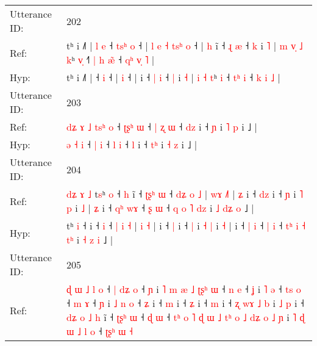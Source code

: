 \documentclass[10pt]{article}
\DeclareRobustCommand{\hl}[1]{{\textcolor{red}{#1}}}
\begin{document}
\begin{longtable}{ll}
Utterance ID: & 202 \\
Ref: & tʰ i ˩˥ |\hl{ }\hl{l}\hl{ }\hl{e} ˧\hl{ }\hl{t}\hl{s}\hl{ʰ} \hl{o} ˧ |\hl{ }\hl{l}\hl{ }\hl{e}\hl{ }\hl{˧}\hl{ }\hl{t}\hl{s}\hl{ʰ} \hl{o} ˧ |\hl{ }\hl{h} i\hl{̃} ˧ \hl{ɻ} \hl{æ} ˧ \hl{k} i \hl{˥} |\hl{ }\hl{m} \hl{v}\hl{̩} \hl{˩} \hl{k}ʰ \hl{v}\hl{̩} ˧\hl{˥} \hl{|}\hl{ }\hl{h} \hl{æ}\hl{̃} ˧ \hl{q}\hl{ʰ} \hl{v}\hl{̩} \hl{˥} |
 \\
Hyp: & tʰ i ˩˥ |\hl{}\hl{}\hl{}\hl{} ˧\hl{}\hl{}\hl{}\hl{} \hl{i} ˧ |\hl{}\hl{}\hl{}\hl{}\hl{}\hl{}\hl{}\hl{}\hl{}\hl{} \hl{i} ˧ |\hl{}\hl{} i\hl{} ˧ \hl{|} \hl{i} ˧ \hl{|} i \hl{˧} |\hl{}\hl{} \hl{}\hl{i} \hl{˧} \hl{t}ʰ \hl{}\hl{i} ˧\hl{} \hl{}\hl{t}\hl{ʰ} \hl{}\hl{i} ˧ \hl{}\hl{k} \hl{}\hl{i} \hl{˩} |
 \\
\midrule
Utterance ID: & 203 \\
Ref: & \hl{d}\hl{ʑ}\hl{ }\hl{ɤ}\hl{ }\hl{˩} \hl{t}\hl{s}\hl{ʰ} \hl{o} ˧ \hl{ʈ}\hl{ʂ}\hl{ʰ} \hl{ɯ} ˧\hl{ }\hl{|} \hl{ʐ} \hl{ɯ} ˧ \hl{d}\hl{z} i ˧ \hl{}\hl{ɲ} i \hl{˥} \hl{p} i ˩ |
 \\
Hyp: & \hl{}\hl{}\hl{}\hl{}\hl{}\hl{ə} \hl{}\hl{}\hl{˧} \hl{i} ˧ \hl{}\hl{}\hl{|} \hl{i} ˧\hl{}\hl{} \hl{l} \hl{i} ˧ \hl{}\hl{l} i ˧ \hl{t}\hl{ʰ} i \hl{˧} \hl{z} i ˩ |
 \\
\midrule
Utterance ID: & 204 \\
Ref: & \hl{d}\hl{ʑ}\hl{ }\hl{ɤ}\hl{ }\hl{˩}\hl{ }t\hl{s}ʰ \hl{o} ˧\hl{ }\hl{h} i\hl{̃} ˧\hl{ }\hl{ʈ}\hl{ʂ}\hl{ʰ} \hl{ɯ} ˧ \hl{d}\hl{ʑ} \hl{o} \hl{˩} | \hl{w}\hl{ɤ} \hl{˩}\hl{˥} |\hl{ }\hl{ʑ} i ˧ \hl{d}\hl{z} i ˧ \hl{ɲ} i \hl{˥} \hl{p} i \hl{˩} |\hl{ }\hl{ʑ} i ˧ \hl{q}\hl{ʰ} \hl{w}\hl{ɤ} ˧ \hl{ʂ} \hl{ɯ} ˧ \hl{}\hl{q} \hl{o} \hl{˥} \hl{d}\hl{z} i \hl{˩} \hl{d}\hl{ʑ} \hl{o} ˩ |
 \\
Hyp: & \hl{}\hl{}\hl{}\hl{}\hl{}\hl{}\hl{}t\hl{}ʰ \hl{i} ˧\hl{}\hl{} i\hl{} ˧\hl{}\hl{}\hl{}\hl{} \hl{i} ˧ \hl{}\hl{|} \hl{i} \hl{˧} | \hl{}\hl{i} \hl{}\hl{˧} |\hl{}\hl{} i ˧ \hl{}\hl{|} i ˧ \hl{|} i \hl{˧} \hl{|} i \hl{˧} |\hl{}\hl{} i ˧ \hl{}\hl{|} \hl{}\hl{i} ˧ \hl{|} \hl{i} ˧ \hl{t}\hl{ʰ} \hl{i} \hl{˧} \hl{t}\hl{ʰ} i \hl{˧} \hl{}\hl{z} \hl{i} ˩ |
 \\
\midrule
Utterance ID: & 205 \\
Ref: & \hl{ɖ}\hl{ }\hl{ɯ}\hl{ }\hl{˩}\hl{ }\hl{l}\hl{ }\hl{o} ˧ \hl{|} \hl{d}\hl{ʑ} \hl{o} ˧\hl{ }\hl{ɲ} i \hl{˥} \hl{m} \hl{æ} \hl{˩} \hl{ʈ}\hl{ʂ}\hl{ʰ} \hl{ɯ} ˧ \hl{n} \hl{e} ˧ \hl{ʝ} i\hl{ }\hl{˥}\hl{ }\hl{ə} ˧ \hl{t}\hl{s} \hl{o} ˧ \hl{m} \hl{ɤ} ˧ \hl{ɲ} i \hl{˩} \hl{n} \hl{o} ˧ \hl{ʑ} i ˧ \hl{m} i ˧ \hl{ʑ} i ˧ \hl{m} i ˧ \hl{ʐ} \hl{w}\hl{ɤ} \hl{˩} \hl{b} i \hl{˩} \hl{p} i ˧ \hl{d}\hl{ʑ} \hl{o} \hl{˩} \hl{h} i\hl{̃} ˧ \hl{ʈ}\hl{ʂ}\hl{ʰ} \hl{ɯ} ˧ \hl{ɖ} \hl{ɯ} ˧ \hl{t}\hl{ʰ} \hl{o} \hl{˥} \hl{ɖ} \hl{ɯ} \hl{˩} \hl{t}\hl{ʰ} \hl{o} \hl{˩} \hl{d}\hl{ʑ} \hl{o} \hl{˩} \hl{ɲ} i\hl{ }\hl{˥}\hl{ }\hl{ɖ} \hl{ɯ} \hl{˩}\hl{ }\hl{l} \hl{o} ˧ \hl{ʈ}\hl{ʂ}\hl{ʰ} \hl{ɯ} \hl{˧}

\end{longtable}
\end{document}
